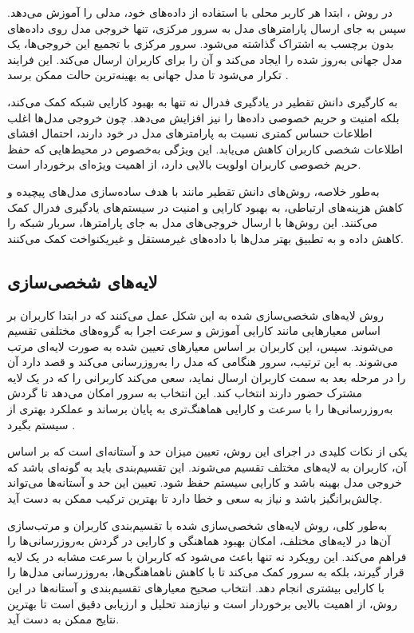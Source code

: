 در روش
%
، ابتدا هر کاربر محلی با استفاده از داده‌های خود، مدلی را آموزش می‌دهد. سپس به جای ارسال پارامترهای مدل به سرور مرکزی، تنها خروجی مدل روی داده‌های بدون برچسب به اشتراک گذاشته می‌شود. سرور مرکزی با تجمیع این خروجی‌ها، یک مدل جهانی به‌روز شده را ایجاد می‌کند و آن را برای کاربران ارسال می‌کند. این فرایند تکرار می‌شود تا مدل جهانی به بهینه‌ترین حالت ممکن برسد
\cite{itahara2021distillation}.

به کارگیری دانش تقطیر در یادگیری فدرال نه تنها به بهبود کارایی شبکه کمک می‌کند، بلکه امنیت و حریم خصوصی داده‌ها را نیز افزایش می‌دهد. چون خروجی مدل‌ها اغلب اطلاعات حساس کمتری نسبت به پارامترهای مدل در خود دارند، احتمال افشای اطلاعات شخصی کاربران کاهش می‌یابد. این ویژگی به‌خصوص در محیط‌هایی که حفظ حریم خصوصی کاربران اولویت بالایی دارد، از اهمیت ویژه‌ای برخوردار است.

به‌طور خلاصه، روش‌های دانش تقطیر مانند
با هدف ساده‌سازی مدل‌های پیچیده و کاهش هزینه‌های ارتباطی، به بهبود کارایی و امنیت در سیستم‌های یادگیری فدرال کمک می‌کنند. این روش‌ها با ارسال خروجی‌های مدل به جای پارامترها، سربار شبکه را کاهش داده و به تطبیق بهتر مدل‌ها با داده‌های غیرمستقل و غیریکنواخت کمک می‌کنند.


\subsection{
	لایه‌های شخصی‌سازی%
	\protect
}
روش لایه‌های شخصی‌سازی شده به این شکل عمل می‌کنند که در ابتدا کاربران بر اساس معیارهایی مانند کارایی آموزش و سرعت اجرا به گروه‌های مختلفی تقسیم می‌شوند. سپس، این کاربران بر اساس معیارهای تعیین شده به صورت لایه‌ای مرتب می‌شوند. به این ترتیب، سرور هنگامی که مدل را به‌روزرسانی می‌کند و قصد دارد آن را در مرحله بعد به سمت کاربران ارسال نماید، سعی می‌کند کاربرانی را که در یک لایه مشترک حضور دارند انتخاب کند. این انتخاب به سرور امکان می‌دهد تا گردش به‌روزرسانی‌ها را با سرعت و کارایی هماهنگ‌تری به پایان برساند و عملکرد بهتری از سیستم بگیرد
\cite{chai2020tifl}.

یکی از نکات کلیدی در اجرای این روش، تعیین میزان حد و آستانه‌ای است که بر اساس آن، کاربران به لایه‌های مختلف تقسیم می‌شوند. این تقسیم‌بندی باید به گونه‌ای باشد که خروجی مدل بهینه باشد و کارایی سیستم حفظ شود. تعیین این حد و آستانه‌ها می‌تواند چالش‌برانگیز باشد و نیاز به سعی و خطا دارد تا بهترین ترکیب ممکن به دست آید.

به‌طور کلی، روش لایه‌های شخصی‌سازی شده با تقسیم‌بندی کاربران و مرتب‌سازی آن‌ها در لایه‌های مختلف، امکان بهبود هماهنگی و کارایی در گردش به‌روزرسانی‌ها را فراهم می‌کند. این رویکرد نه تنها باعث می‌شود که کاربران با سرعت مشابه در یک لایه قرار گیرند، بلکه به سرور کمک می‌کند تا با کاهش ناهماهنگی‌ها، به‌روزرسانی مدل‌ها را با کارایی بیشتری انجام دهد. انتخاب صحیح معیارهای تقسیم‌بندی و آستانه‌ها در این روش، از اهمیت بالایی برخوردار است و نیازمند تحلیل و ارزیابی دقیق است تا بهترین نتایج ممکن به دست آید.




